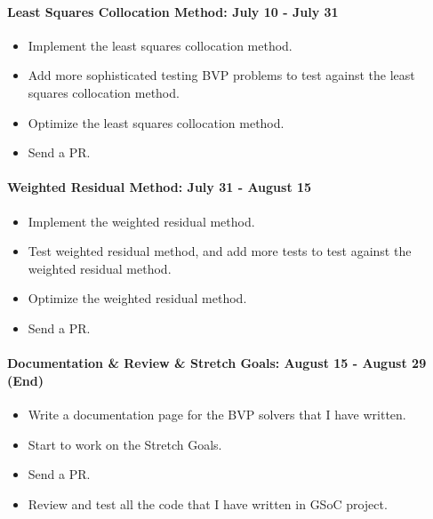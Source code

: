 \documentclass[a4paper,12pt,onecolumn]{article}
\begin{document}
\paragraph{Least Squares Collocation Method: July 10 - July 31} %
\label{par:least_squares_method_july_10_july_31}
\begin{itemize}
	\item Implement the least squares collocation method.
	\item Add more sophisticated testing BVP problems to test against the least squares
	collocation method.
	\item Optimize the least squares collocation method.
	\item Send a PR.
\end{itemize}

\paragraph{Weighted Residual Method: July 31 - August 15} %
\label{par:weighted_residual_method_july_31_august_15}
\begin{itemize}
	\item Implement the weighted residual method.
	\item Test weighted residual method, and add more tests to test against the weighted
	residual method.
	\item Optimize the weighted residual method.
	\item Send a PR.
\end{itemize}

\paragraph{Documentation \& Review \& Stretch Goals: August 15 - August 29 (End)} %
\label{par:review_&_stretch_goals_august_15_august_29}
\begin{itemize}
	\item Write a documentation page for the BVP solvers that I have written.
	\item Start to work on the Stretch Goals.
	\item Send a PR.
	\item Review and test all the code that I have written in GSoC project.
\end{itemize}
\end{document}

